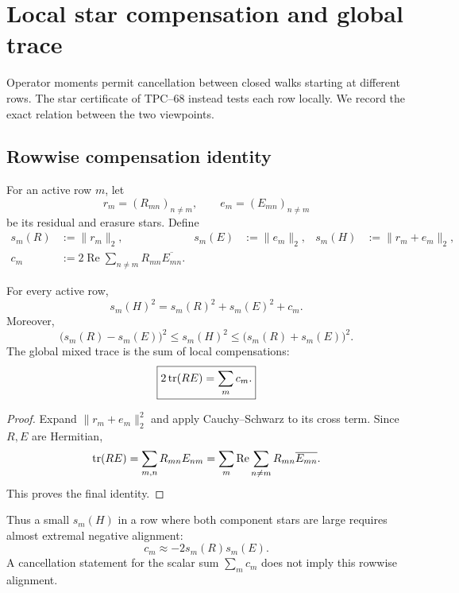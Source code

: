 \section{Local star compensation and global trace}
\label{sec:local-star}

Operator moments permit cancellation between closed walks starting at
different rows.  The star certificate of TPC--68 instead tests each row
locally.  We record the exact relation between the two viewpoints.

\subsection{Rowwise compensation identity}

For an active row \(m\), let
\[
 r_m=(R_{mn})_{n\ne m},
 \qquad
 e_m=(E_{mn})_{n\ne m}
\]
be its residual and erasure stars.  Define
\begin{align}
 s_m(R)&:=\|r_m\|_2,
 &
 s_m(E)&:=\|e_m\|_2,
 &
 s_m(H)&:=\|r_m+e_m\|_2,
 \label{eq:local-stars}\\
 c_m&:=2\operatorname{Re}
 \sum_{n\ne m}R_{mn}\overline{E_{mn}}.
 \label{eq:local-compensation}
\end{align}

\begin{proposition}
\label{prop:local-compensation}
For every active row,
\begin{equation}
 \boxed{
 s_m(H)^2=s_m(R)^2+s_m(E)^2+c_m.}
 \label{eq:local-compensation-identity}
\end{equation}
Moreover,
\begin{equation}
 \bigl(s_m(R)-s_m(E)\bigr)^2
 \le s_m(H)^2
 \le
 \bigl(s_m(R)+s_m(E)\bigr)^2.
 \label{eq:local-star-triangle}
\end{equation}
The global mixed trace is the sum of local compensations:
\begin{equation}
 \boxed{
 2\operatorname{tr}(RE)=\sum_m c_m.}
 \label{eq:global-local-compensation}
\end{equation}
\end{proposition}

\begin{proof}
Expand \(\|r_m+e_m\|_2^2\) and apply Cauchy--Schwarz to its cross term.
Since \(R,E\) are Hermitian,
\[
 \operatorname{tr}(RE)
 =
 \sum_{m,n}R_{mn}E_{nm}
 =
 \sum_m\operatorname{Re}
 \sum_{n\ne m}R_{mn}\overline{E_{mn}}.
\]
This proves the final identity.
\end{proof}

Thus a small \(s_m(H)\) in a row where both component stars are large
requires almost extremal negative alignment:
\[
 c_m\approx-2s_m(R)s_m(E).
\]
A cancellation statement for the scalar sum
\(\sum_mc_m\) does not imply this rowwise alignment.

